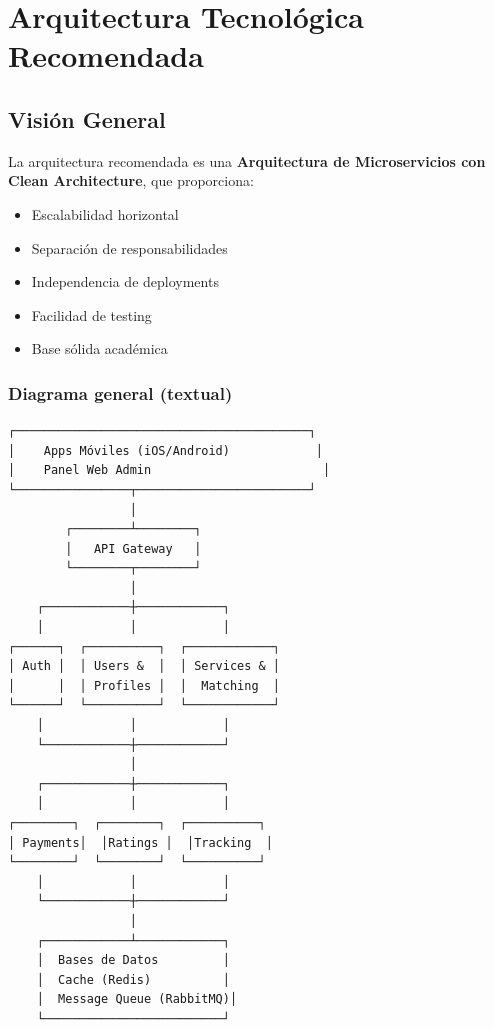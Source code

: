 \documentclass[12pt,a4paper,spanish]{article}
\begin{document}
\newpage

\section{Arquitectura Tecnológica Recomendada}

\subsection{Visión General}

La arquitectura recomendada es una \textbf{Arquitectura de Microservicios con Clean Architecture}, que proporciona:

\begin{itemize}
    \item Escalabilidad horizontal
    \item Separación de responsabilidades
    \item Independencia de deployments
    \item Facilidad de testing
    \item Base sólida académica
\end{itemize}

\subsubsection{Diagrama general (textual)}

\begin{lstlisting}
┌─────────────────────────────────────────┐
│    Apps Móviles (iOS/Android)            │
│    Panel Web Admin                        │
└────────────────┬────────────────────────┘
                 │
        ┌────────┴────────┐
        │   API Gateway   │
        └────────┬────────┘
                 │
    ┌────────────┼────────────┐
    │            │            │
┌──────┐  ┌──────────┐  ┌────────────┐
│ Auth │  │ Users &  │  │ Services & │
│      │  │ Profiles │  │  Matching  │
└──────┘  └──────────┘  └────────────┘
    │            │            │
    └────────────┼────────────┘
                 │
    ┌────────────┼────────────┐
    │            │            │
┌────────┐  ┌────────┐  ┌──────────┐
│ Payments│  │Ratings │  │Tracking  │
└────────┘  └────────┘  └──────────┘
    │            │            │
    └────────────┼────────────┘
                 │
    ┌────────────┴────────────┐
    │  Bases de Datos         │
    │  Cache (Redis)          │
    │  Message Queue (RabbitMQ)│
    └─────────────────────────┘
\end{lstlisting}
\end{document}
